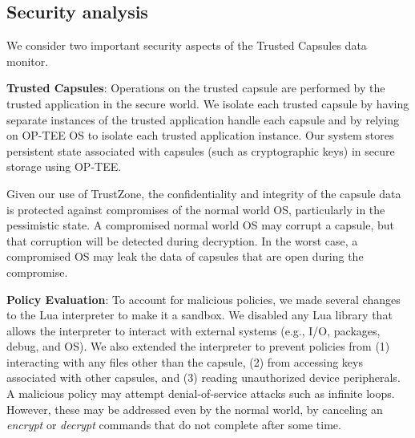 
\subsection{Security analysis}

We consider two important security aspects of the Trusted Capsules data monitor.

\textbf{Trusted Capsules}: Operations on the trusted capsule are performed by
the trusted application in the secure world. We isolate each trusted capsule by
having separate instances of the trusted application handle each capsule and
by relying on OP-TEE OS to isolate each trusted application instance.
Our system stores persistent state associated with capsules (such as cryptographic keys)
in secure storage using OP-TEE.

Given our use of TrustZone, the confidentiality and integrity of the capsule
data is protected against compromises of the normal world OS, particularly in
the pessimistic state. A compromised normal world OS may corrupt a capsule, but
that corruption will be detected during decryption. In the worst case, a compromised OS
may leak the data of capsules that are open during the compromise.

\textbf{Policy Evaluation}: To account for malicious policies, we made several
changes to the Lua interpreter to make it a sandbox. We disabled any Lua library
that allows the interpreter to interact with external systems (e.g., I/O,
packages, debug, and OS). We also extended the interpreter to prevent policies
from (1) interacting with any files other than the capsule, (2) from accessing
keys associated with other capsules, and (3) reading unauthorized device
peripherals. A malicious policy may attempt denial-of-service attacks such as
infinite loops. However, these may be addressed even by the normal world, by
canceling an {\em encrypt} or {\em decrypt} commands that do not complete after
some time.
